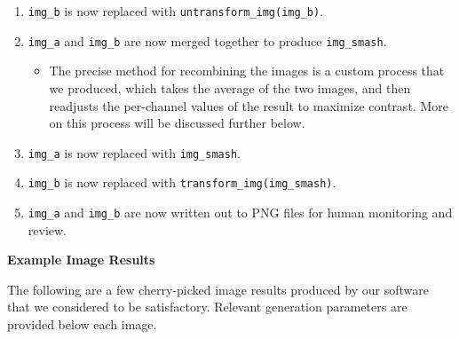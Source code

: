 \documentclass[12pt,letterpaper]{article}
\begin{document}
\begin{enumerate}
\begin{enumerate}
\begin{itemize}
            \end{itemize}
            \item \texttt{img\_b} is now replaced with \texttt{untransform\_img(img\_b)}.
            \item \texttt{img\_a} and \texttt{img\_b} are now merged together to produce \texttt{img\_smash}.
            \begin{itemize}
                \item The precise method for recombining the images is a custom process that we produced, which takes the average of the two images, and then readjusts the per-channel values of the result to maximize contrast. More on this process will be discussed further below.
            \end{itemize}
            \item \texttt{img\_a} is now replaced with \texttt{img\_smash}.
            \item \texttt{img\_b} is now replaced with \texttt{transform\_img(img\_smash)}.
            \item \texttt{img\_a} and \texttt{img\_b} are now written out to PNG files for human monitoring and review.
        \end{enumerate}
    \end{enumerate}

    \noindent\textbf{Example Image Results}\setlength{\parskip}{0pt}

    The following are a few cherry-picked image results produced by our software that we considered to be satisfactory. Relevant generation parameters are provided below each image.\setlength{\parskip}{12pt}
\end{document}

